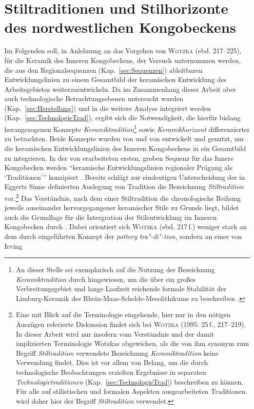 \section{Stiltraditionen und Stilhorizonte des nordwestlichen Kongobeckens}\label{sec:Horizonte}\label{sec:NgokoTradition}

Im Folgenden soll, in Anlehnung an das Vorgehen von \textsc{Wotzka} (ebd. 217--225), für die Keramik des Inneren Kongobeckens, der Versuch unternommen werden, die aus den Regionalsequenzen (Kap.~\ref{sec:Sequenzen}) ableitbaren Entwicklungslinien zu einem Gesamtbild der keramischen Entwicklung des Arbeitsgebietes weiterzuentwickeln. Da im Zusammenhang dieser Arbeit aber auch technologische Betrachtungsebenen untersucht wurden (Kap.~\ref{sec:Herstellung}) und in die weitere Analyse integriert werden (Kap.~\ref{sec:TechnologieTrad}), ergibt sich die Notwendigkeit, die hierfür bislang herangezogenen Konzepte \textit{Keramiktradition}\footnote{An dieser Stelle sei exemplarisch auf die Nutzung der Bezeichnung \textit{Keramiktradition} durch \textcites{Modderman.1970}{Modderman.1974}{Modderman.1982} hingewiesen, um die über ein großes Verbreitungsgebiet und lange Laufzeit reichende formale Stabilität der Limburg-Keramik des Rhein-Maas-Schelde-Mesolithikums zu beschreiben \parencite[nach][41]{Constantin.2010}.} sowie \textit{Keramikhorizont} differenzierter zu betrachten. Beide Konzepte wurden von \textcites[295]{Eggert.1983}[250, 257 Anm.~20]{Eggert.1984}[28\,f.]{Eggert.1988} und von \textcite[217--225]{Wotzka.1995} entwickelt und genutzt, um die keramischen Entwicklungslinien des Inneren Kongobeckens in ein Gesamtbild zu integrieren. In der von \textcite[285--295]{Eggert.1983} erarbeiteten ersten, groben Sequenz für das Innere Kongobecken werden \enquote{keramische Entwicklungslinien regionaler Prägung als \enquote{Traditionen}} konzipiert \parencite[217]{Wotzka.1995}. Bereits \textcite{Wotzka.1995} schlägt zur eindeutigen Unterscheidung der in Eggerts Sinne definierten Auslegung von Tradition die Bezeichnung \textit{Stiltradition} vor.\footnote{Eine mit Blick auf die Terminologie eingehende, hier nur in den nötigen Auszügen referierte Diskussion findet sich bei \textsc{Wotzka} (1995: 25\,f., 217--219). In dieser Arbeit wird nur insofern vom Verständnis und der damit implizierten Terminologie Wotzkas abgewichen, als die von ihm synonym zum Begriff \textit{Stiltradition} verwendete Bezeichnung \textit{Keramiktradition} keine Verwendung findet. Dies ist vor allem von Belang, um die durch technologische Beobachtungen erzielten Ergebnisse in separaten \textit{Technologietraditionen} (Kap.~\ref{sec:TechnologieTrad}) beschreiben zu können. Für alle auf stilistischen und formalen Aspekten ausgearbeiteten Traditionen wird daher hier der Begriff \textit{Stiltradition} verwendet.} Das Verständnis, nach dem einer Stiltradition die chronologische Reihung jeweils auseinander hervorgegangener keramischer Stile zu Grunde liegt, bildet auch die Grundlage für die Intergration der Stilentwicklung im Inneren Kongobecken durch \textcite[]{Wotzka.1995}. Dabei orientiert sich \textsc{Wotzka} (ebd. 217\,f.) weniger stark an dem durch \textcite[53]{Willey.1945} eingeführten Konzept der \textit{pottery tra"-di"-tion}, sondern an einer von Irving 